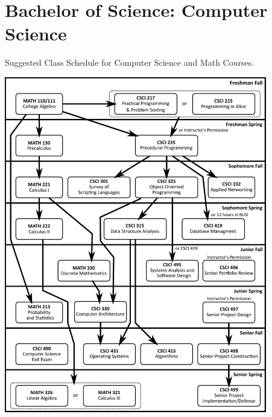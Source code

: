 %
\section*{Bachelor of Science: Computer Science}
\begin{center}
Suggested Class Schedule for Computer Science and Math Courses.
% 

\includegraphics[width=0.86\textwidth]{images/PrerequisiteDiagram_BS_ComputerScience}
\end{center}
